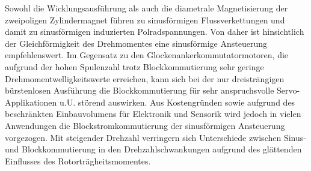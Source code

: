 Sowohl die Wicklungsausführung als auch die diametrale Magnetisierung der zweipoligen Zylindermagnet führen zu sinusförmigen Flussverkettungen und damit zu sinusförmigen induzierten Polradspannungen. Von daher ist hinsichtlich der Gleichförmigkeit des Drehmomentes eine sinusförmige Ansteuerung empfehlenswert. Im Gegensatz zu den Glockenankerkommutatormotoren, die aufgrund der hohen Spulenzahl trotz Blockkommutierung sehr geringe Drehmomentwelligkeitswerte erreichen, kann sich bei der nur dreisträngigen bürstenlosen Ausführung die Blockkommutierung für sehr anspruchsvolle Servo-Applikationen u.U. störend auswirken. Aus Kostengründen sowie aufgrund des beschränkten Einbauvolumens für Elektronik und Sensorik wird jedoch in vielen Anwendungen die Blockstromkommutierung der sinusförmigen Ansteuerung vorgezogen. Mit steigender Drehzahl verringern sich Unterschiede zwischen Sinus- und Blockkommutierung in den Drehzahlschwankungen aufgrund des glättenden Einflusses des Rotorträgheitsmomentes. \parencite[S. 78]{Stölting2011}




